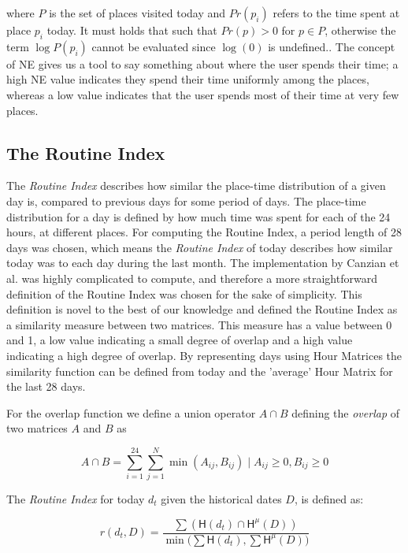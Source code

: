 where $P$ is the set of places visited today and $Pr(p_i)$ refers to the time spent at place $p_i$ today. It must holds that such that $Pr(p) > 0$ for $p \in P$, otherwise the term $\log P(p_i)$ cannot be evaluated since $\log(0)$ is undefined.. The concept of NE gives us a tool to say something about where the user spends their time; a high NE value indicates they spend their time uniformly among the places, whereas a low value indicates that the user spends most of their time at very few places. 

\subsection{The Routine Index}
The \textit{Routine Index} describes how similar the place-time distribution of a given day is, compared to previous days for some period of days. The place-time distribution for a day is defined by how much time was spent for each of the 24 hours, at different places. For computing the Routine Index, a period length of 28 days was chosen, which means the \textit{Routine Index} of today describes how similar today was to each day during the last month. The implementation by Canzian et al. \cite{Canzian2015} was highly complicated to compute, and therefore a more straightforward definition of the Routine Index was chosen for the sake of simplicity. This definition is novel to the best of our knowledge and defined the Routine Index as a similarity measure between two matrices. This measure has a value between 0 and 1, a low value indicating a small degree of overlap and a high value indicating a high degree of overlap. By representing days using Hour Matrices the similarity function can be defined from today and the 'average' Hour Matrix for the last 28 days. 

For the overlap function we define a union operator $A \cap B$ defining the \textit{overlap} of two matrices $A$ and $B$ as 

\begin{equation}
\label{eq:overlap-function}
    A \cap B = \sum_{i=1}^{24} \sum_{j=1}^{N} \min (A_{ij}, B_{ij}) \;|\; A_{ij} \geq 0, B_{ij} \geq 0
\end{equation}

The \textit{Routine Index} for today $d_t$ given the historical dates $D$, is defined as: 

\begin{equation}
\label{eq:feature-routine-index}
r(d_t, D) = \frac{\sum (\mathsf{H}(d_t) \cap \mathsf{H}^{\mu} (D) )}{\min \Big(\sum \mathsf{H}(d_t), \sum \mathsf{H}^{\mu} (D) \Big)}
\end{equation}

